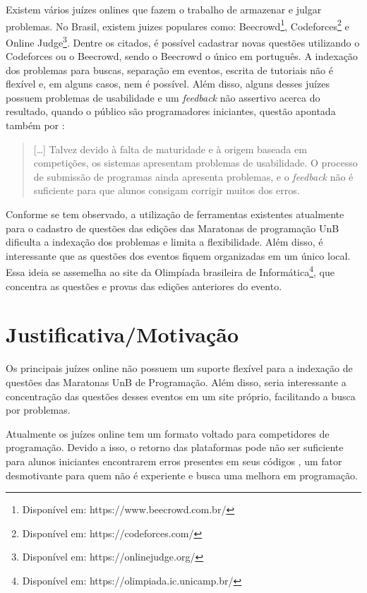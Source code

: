 Existem vários juízes onlines que fazem o trabalho de armazenar e julgar problemas. No Brasil, existem juizes populares como: Beecrowd\footnote{Disponível em: https://www.beecrowd.com.br/}, Codeforces\footnote{Disponível em: https://codeforces.com/} e Online Judge\footnote{Disponível em: https://onlinejudge.org/}. Dentre os citados, é possível cadastrar novas questões utilizando o Codeforces ou o Beecrowd, sendo o Beecrowd o único em português. A indexação dos problemas para buscas, separação em eventos, escrita de tutoriais não é flexível e, em alguns casos, nem é possível. Além disso, alguns desses juízes possuem problemas de usabilidade e um \textit{feedback} não assertivo acerca do resultado, quando o público são programadores iniciantes, questão apontada também por :
\begin{quotation}
     [\dots] Talvez devido à falta de maturidade e à origem baseada em competições, os sistemas apresentam problemas de usabilidade. O processo de submissão de programas ainda apresenta problemas, e o \textit{feedback} não é suficiente para que alunos consigam corrigir muitos dos erros.
\end{quotation}

Conforme se tem observado, a utilização de ferramentas existentes atualmente para o cadastro de questões das edições das Maratonas de programação UnB dificulta a indexação dos problemas e limita a flexibilidade. Além disso, é interessante que as questões dos eventos fiquem organizadas em um único local. Essa ideia se assemelha ao site da Olimpíada brasileira de Informática\footnote{Disponível em: https://olimpiada.ic.unicamp.br/}, que concentra as questões e provas das edições anteriores do evento.

\section{Justificativa/Motivação}
\label{sec:justificativa}

Os principais juízes online não possuem um suporte flexível para a indexação de questões das Maratonas UnB de Programação. Além disso, seria interessante a concentração das questões desses eventos em um site próprio, facilitando a busca por problemas.

Atualmente os juízes online tem um formato voltado para competidores de programação. Devido a isso, o retorno das plataformas pode não ser suficiente para alunos iniciantes encontrarem erros presentes em seus códigos \cite{francisco2016juiz}, um fator desmotivante para quem não é experiente e busca uma melhora em programação.

